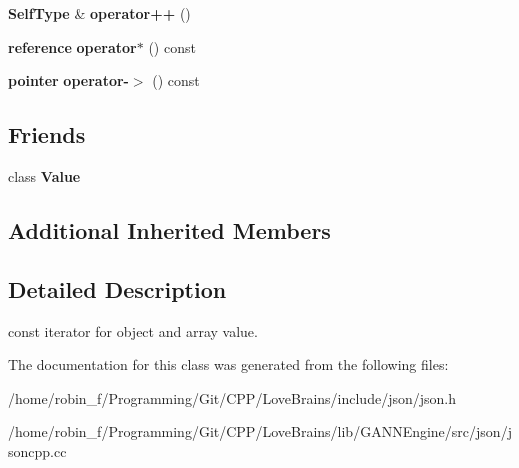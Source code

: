 \begin{DoxyCompactItemize}
\item 
{\bf Self\+Type} \& {\bfseries operator++} ()\label{class_json_1_1_value_const_iterator_a2cfe2f7a94a688186efdafb1b181c319}

\item 
{\bf reference} {\bfseries operator$\ast$} () const \label{class_json_1_1_value_const_iterator_aeb44153d71c61ac9397a84d5ecc244c5}

\item 
{\bf pointer} {\bfseries operator-\/$>$} () const \label{class_json_1_1_value_const_iterator_ac493d31c8eede8af10b71415fe8e624b}

\end{DoxyCompactItemize}
\subsection*{Friends}
\begin{DoxyCompactItemize}
\item 
class {\bfseries Value}\label{class_json_1_1_value_const_iterator_a896c037a32087c5c20d97e64a1786880}

\end{DoxyCompactItemize}
\subsection*{Additional Inherited Members}


\subsection{Detailed Description}
const iterator for object and array value. 



The documentation for this class was generated from the following files\+:\begin{DoxyCompactItemize}
\item 
/home/robin\+\_\+f/\+Programming/\+Git/\+C\+P\+P/\+Love\+Brains/include/json/json.\+h\item 
/home/robin\+\_\+f/\+Programming/\+Git/\+C\+P\+P/\+Love\+Brains/lib/\+G\+A\+N\+N\+Engine/src/json/jsoncpp.\+cc\end{DoxyCompactItemize}
